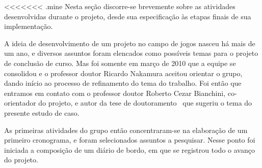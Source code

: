 \begin{comment}
\subsection{Primeira milestone (30 setembro)}
\begin{itemize}
\item pesquisa de coleções de arte (gráficos e som) que serão usadas no trabalho
\item porte do projeto para o Subversion
\item solução para comunicação entre processos Java e C++ do jogo
\item elaboração de tabelas para modelagem de características de personagens do jogo.
\item mecanismos de escrita e leitura do quadro-negro (blackboard)
\item roteiro de aceitação do projeto
\item capítulos introdutórios e de especificação da monografia
\end{itemize}

Das atividades listadas na primeira milestone, apenas os mecanismos de escrita e leitura no blackboard e o roteiro de aceitação do projeto não respeitaram a data proposta. Isso se deveu ao fato de que ainda havia a necessidade de aumentar o nível de detalhamento  nas especificações do jogo e da arquitetura do software como um todo. Por outro lado, o grupo foi capaz de adiantar algumas atividades definidas nas outras milestones, tais como a modelagem de agentes mais simples e subsistemas da lógica do jogo.
\end{comment}

<<<<<<< .mine
Nesta seção discorre-se brevemente sobre as atividades desenvolvidas durante o projeto, desde sua especificação às etapas finais de sua implementação.

A ideia de desenvolvimento de um projeto no campo de jogos nasceu há mais de um ano, e diversos assuntos foram elencados como possíveis temas para o projeto de conclusão de curso. Mas foi somente em março de 2010 que a equipe se consolidou e o professor doutor Ricardo Nakamura aceitou orientar o grupo, dando início ao processo de refinamento do tema do trabalho. Foi então que entramos em contato com o professor doutor Roberto Cezar Bianchini, co-orientador do projeto, e autor da tese de doutoramento~\cite{tese_roberto} que sugeriu o tema do presente estudo de caso.  

As primeiras atividades do grupo então concentraram-se na elaboração de um primeiro cronograma, e foram selecionados assuntos a pesquisar. Nesse ponto foi iniciada a composição de um diário de bordo, em que se registrou todo o avanço do projeto.

